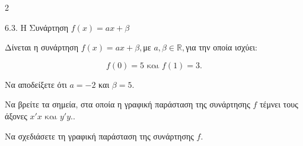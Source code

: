 \begin{ylh}{2}
    \item 6.3. Η Συνάρτηση $f(x)=ax+\beta$
\end{ylh}
Δίνεται η συνάρτηση $f(x) = a x + \beta,$με $a,\beta \in {\mathbb{R}},$για την οποία ισχύει:

\begin{equation*}f(0) = 5\text{ και }f(1) = 3.\end{equation*}

\begin{alist}
\item Να αποδείξετε ότι $a=-2$ και $\beta=5$.
\item Να βρείτε τα σημεία, στα οποία η γραφική παράσταση της συνάρτησης $f$ τέμνει τους άξονες $x'x\text{ και }y'y.$.

\item Να σχεδιάσετε τη γραφική παράσταση της συνάρτησης $f.$
\end{alist}

